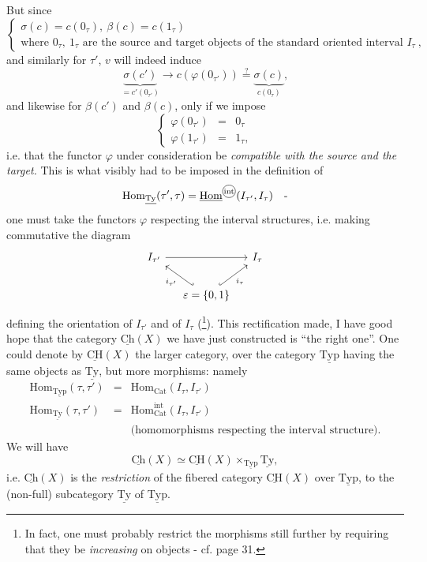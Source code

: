 \documentclass[11pt]{article}
\newcommand{\printedpage}[1]{\marginpar{\footnotesize p.~#1}}
\newcommand{\msp}[1]{\marginpar{\footnotesize [#1]}}
\newcommand{\ul}[1]{\underline{\mathrm{#1}}}
\newcommand{\circled}[1]{\tikz[baseline=(c.base)]\node[draw,circle,inner sep=0.4pt](c){\scriptsize #1};}
\begin{document}
\printedpage{19}

\msp{page 29}
But since
\[
\left\{
\begin{array}{l}
\sigma(c)=c(0_\tau),\ \beta(c)=c(1_\tau)\\[1ex]
\text{where } 0_\tau,\ 1_\tau \text{ are the source and target objects of the standard oriented interval } I_\tau\ ,
\end{array}
\right.
\]
and similarly for $\tau'$, $v$ will indeed induce
\[
\underbrace{\sigma(c')}_{=c'(0_{\tau'})} \longrightarrow c(\varphi(0_{\tau'})) \overset{?}{=} \underbrace{\sigma(c)}_{c(0_\tau)},
\]
and likewise for $\beta(c')$ and $\beta(c)$, only if we impose
\[
\boxed{
\left\{
\begin{array}{lcl}
\varphi(0_{\tau'}) & = & 0_\tau\\
\varphi(1_{\tau'}) & = & 1_\tau,
\end{array}
\right.
}
\]
i.e. that the functor $\varphi$ under consideration be \textit{compatible with the source and the target.} This is what visibly had to be imposed in the definition of %
\[
\mathrm{Hom}_{\ul{Ty}}(\tau',\tau)=\underline{\mathrm{Hom}}^{\circled{int}}(I_{\tau'},I_\tau)\quad\text{-}
\]
one must take the functors $\varphi$ respecting the interval structures, i.e. making commutative the diagram
\[
\begin{tikzcd}[column sep=small]
I_{\tau'} \arrow[rr] & & I_\tau \\
& \varepsilon=\{0,1\} \arrow[ul, hook', "i_{\tau'}"] \arrow[ur, hook, "i_\tau"'] &
\end{tikzcd}
\]
defining the orientation of $I_{\tau'}$ and of $I_\tau$ (\footnote[10]{In fact, one must probably restrict the morphisms still further by requiring that they be \textit{increasing} on objects - cf. page 31.}). This rectification made, I have good hope that the category $\ul{Ch}(X)$ we have just constructed is ``the right one''. One could denote by $\ul{CH}(X)$ the larger category, over the category $\ul{Typ}$ having the same objects as $\ul{Ty}$, but more morphisms: namely %
\msp{page 30}
\[
\begin{array}{lcl}
\mathrm{Hom}_{\ul{Typ}}(\tau,\tau') & = & \mathrm{Hom}_{\mathrm{Cat}}(I_\tau,I_{\tau'})\\[0.5ex]
\mathrm{Hom}_{\ul{Ty}}(\tau,\tau') & = & \mathrm{Hom}^{\mathrm{int}}_{\mathrm{Cat}}(I_\tau,I_{\tau'})\\[0.5ex]
 & & \text{(homomorphisms respecting the interval structure).}
\end{array}
\]
We will have
\[
\ul{Ch}(X)\simeq\ul{CH}(X)\times_{\ul{Typ}}\ul{Ty},
\]
\printedpage{20}
i.e. $\ul{Ch}(X)$ is the \textit{restriction} of the fibered category $\ul{CH}(X)$ over $\ul{Typ}$, to the (non-full) subcategory $\ul{Ty}$ of $\ul{Typ}$.
\end{document}

